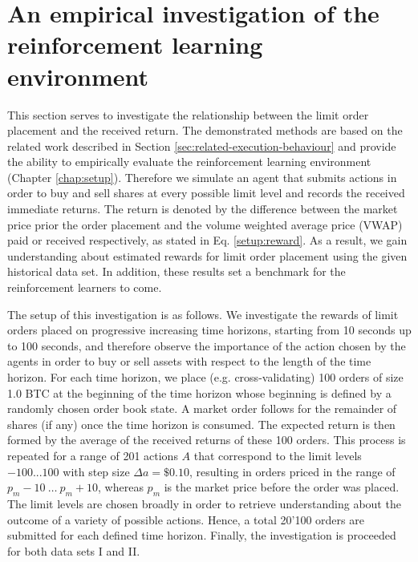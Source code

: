 \section{An empirical investigation of the reinforcement learning environment}
\label{sec:eval-empirical}
This section serves to investigate the relationship between the limit order placement and the received return.
The demonstrated methods are based on the related work described in Section \ref{sec:related-execution-behaviour} and provide the ability to empirically evaluate the reinforcement learning environment (Chapter \ref{chap:setup}).
Therefore we simulate an agent that submits actions in order to buy and sell shares at every possible limit level and records the received immediate returns.
The return is denoted by the difference between the market price prior the order placement and the volume weighted average price (VWAP) paid or received respectively, as stated in Eq. \ref{setup:reward}.
As a result, we gain understanding about estimated rewards for limit order placement using the given historical data set.
In addition, these results set a benchmark for the reinforcement learners to come.

The setup of this investigation is as follows.
We investigate the rewards of limit orders placed on progressive increasing time horizons, starting from 10 seconds up to 100 seconds, and therefore observe the importance of the action chosen by the agents in order to buy or sell assets with respect to the length of the time horizon.
For each time horizon, we place (e.g. cross-validating) 100 orders of size 1.0 BTC at the beginning of the time horizon whose beginning is defined by a randomly chosen order book state. 
A market order follows for the remainder of shares (if any) once the time horizon is consumed.
The expected return is then formed by the average of the received returns of these 100 orders.
This process is repeated for a range of 201 actions $A$ that correspond to the limit levels $-100...100$ with step size $\Delta{a} = \$0.10$, resulting in orders priced in the range of $p_m-10 \ \dots \ p_m+10$, whereas $p_m$ is the market price before the order was placed.
The limit levels are chosen broadly in order to retrieve understanding about the outcome of a variety of possible actions.
Hence, a total 20'100 orders are submitted for each defined time horizon.
Finally, the investigation is proceeded for both data sets I and II.

